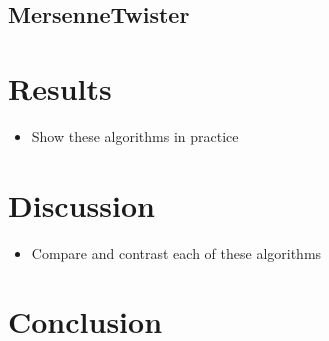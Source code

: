 \documentclass{article}
\begin{document}
        \subsection*{MersenneTwister}

    \section*{Results}

        \begin{itemize}
            \item Show these algorithms in practice
        \end{itemize}

    \section*{Discussion}

        \begin{itemize}
            \item Compare and contrast each of these algorithms
        \end{itemize}

    \section*{Conclusion}

    \printbibliography
\end{document}
